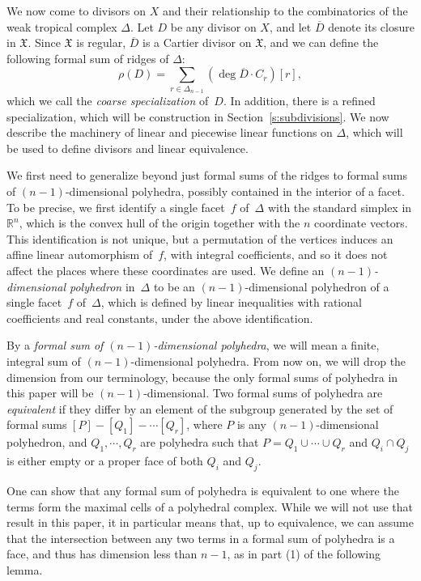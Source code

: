 \documentclass[11pt]{amsart}
\theoremstyle{definition}
\newcommand{\defi}[1]{\emph{#1}}
\newcommand{\degree}{\operatorname{deg}}
\newcommand{\RR}{\mathbb R}
\newcommand{\X}{\mathfrak X}
\begin{document}
We now come to divisors on $X$ and their relationship to the combinatorics of
the weak tropical complex $\Delta$. Let $D$ be any divisor on $X$, and let
$\overline D$ denote its closure in $\X$. Since $\X$ is regular, $\overline D$
is a Cartier divisor on $\X$, and we can define the following formal sum of
ridges of $\Delta$:
\begin{equation}\label{eq:specialization}
\rho(D) = \sum_{r \in \Delta_{n-1}} (\degree \overline D \cdot C_r) [r],
\end{equation}
which we call the \defi{coarse specialization} of~$D$. In addition, there is a
refined specialization, which will be construction in
Section~\ref{s:subdivisions}. We now describe the machinery of linear and
piecewise linear functions on $\Delta$, which will be used to define divisors
and linear equivalence.

We first need to generalize beyond just formal sums of the ridges to formal sums
of $(n-1)$-dimensional polyhedra, possibly contained in the interior of a facet.
To be precise, we first identify a single facet~$f$ of~$\Delta$ with the
standard simplex in $\RR^n$, which is the convex hull of the origin together
with the $n$ coordinate vectors. This identification is not unique, but a
permutation of the vertices induces an affine linear automorphism of~$f$, with
integral coefficients, and so it does not affect the places where these
coordinates are used. We define an \defi{$(n-1)$-dimensional polyhedron}
in~$\Delta$ to be an $(n-1)$-dimensional polyhedron of a single facet~$f$
of~$\Delta$, which is defined by linear inequalities with rational coefficients
and real constants, under the above identification.

By a \defi{formal sum of $(n-1)$-dimensional polyhedra}, we will mean a finite,
integral
sum of $(n-1)$-dimensional polyhedra.
From now on, we will drop the dimension from our terminology, because the only
formal sums of polyhedra in this paper will be $(n-1)$-dimensional. Two formal
sums of polyhedra are \defi{equivalent} if they differ by an element of the
subgroup generated by the set of formal sums $[P] - [Q_1] - \cdots [Q_r]$, where
$P$ is any $(n-1)$-dimensional polyhedron, and $Q_1, \cdots, Q_r$ are polyhedra
such that $P = Q_1 \cup \cdots \cup Q_r$ and $Q_i \cap Q_j$ is either empty or a
proper face of both $Q_i$ and $Q_j$.

One can show that any formal sum of polyhedra is equivalent to one
where the terms form the maximal cells of a polyhedral complex. While we will
not use that result in this paper, it in particular means that,
up to equivalence, we can assume that the intersection between any two terms in
a formal sum of polyhedra is a face, and thus has dimension less than $n-1$, as
in part (1) of the following lemma.
\end{document}
